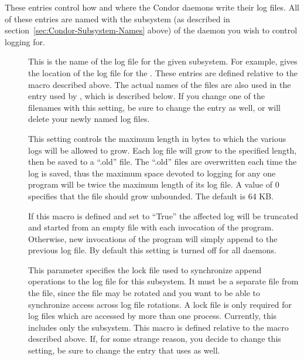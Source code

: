 These entries control how and where the Condor daemons write their log
files.  All of these entries are named with the subsystem (as
described in section~\ref{sec:Condor-Subsystem-Names} above) of the daemon
you wish to control logging for.
\begin{description}
 
\item[] \label{param:SubsysLog} This is the name of
  the log file for the given subsystem.  For example,
   gives the location of the log file for the
  .  These entries are defined relative to the
   macro described above.  The actual names of the files
  are also used in the  entry used by
  , which is described below.  If you change one of the
  filenames with this setting, be sure to change the
   entry as well, or  will
  delete your newly named log files.

\item[] \label{param:MaxSubsysLog} This
  setting controls the maximum length in bytes to which the various
  logs will be allowed to grow.  Each log file will grow to the
  specified length, then be saved to a ``.old'' file.  The ``.old''
  files are overwritten each time the log is saved, thus the maximum
  space devoted to logging for any one program will be twice the
  maximum length of its log file.  A value of 0 specifies that the
  file should grow unbounded.  The default is 64 KB.

\item[]
  \label{param:TruncSubsysLogOnOpen}  If this macro is defined and set
  to ``True'' the affected log will be truncated and started from an
  empty file with each invocation of the program.  Otherwise, new
  invocations of the program will simply append to the previous log
  file.  By default this setting is turned off for all daemons. 

\item[] \label{param:SubsysLock} This parameter
  specifies the lock file used to synchronize append operations to the
  log file for this subsystem.  It must be a separate file from the
   file, since the  file may be
  rotated and you want to be able to synchronize access across log
  file rotations.  A lock file is only required for log files which
  are accessed by more than one process.  Currently, this includes
  only the  subsystem.  This macro is defined relative
  to the  macro described above.  If, for some strange
  reason, you decide to change this setting, be sure to change the
   entry that  uses as well.


\end{description}
